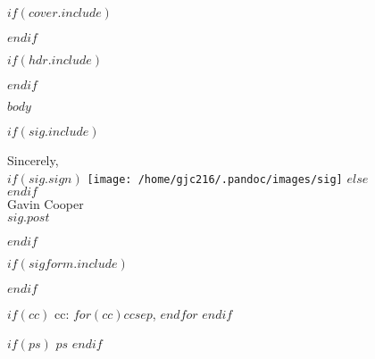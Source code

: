 \documentclass[$size$]{article}
\newcommand{\coverpage}[0]{
	$if(cover.include)$
		
	$endif$
}
\newcommand{\header}[0]{
	$if(hdr.include)$
		
	$endif$
}
\begin{document}
\coverpage

\header

$body$

$if(sig.include)$
    \begin{minipage}[t]{6.5in}
    Sincerely,\\
    $if(sig.sign)$
        \vspace{-0.2in}\texttt{[image: /home/gjc216/.pandoc/images/sig]}
    $else$
        \\
    $endif$
    \\
    Gavin Cooper\\
    $sig.post$
    \end{minipage}
$endif$

$if(sigform.include)$
	
$endif$

$if(cc)$
    cc: $for(cc)$$cc$$sep$, $endfor$
$endif$

$if(ps)$
    $ps$
$endif$
\end{document}
